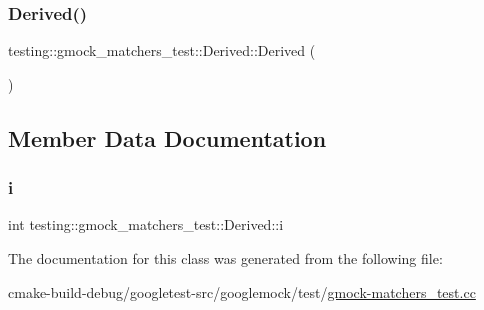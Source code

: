 \subsubsection{\texorpdfstring{Derived()}{Derived()}}
{\footnotesize\ttfamily testing\+::gmock\+\_\+matchers\+\_\+test\+::\+Derived\+::\+Derived (\begin{DoxyParamCaption}{ }\end{DoxyParamCaption})\hspace{0.3cm}{\ttfamily [inline]}}



\subsection{Member Data Documentation}
\mbox{\label{classtesting_1_1gmock__matchers__test_1_1Derived_a357d6747c44d7af7159fb5898a782f1b}} 
\subsubsection{\texorpdfstring{i}{i}}
{\footnotesize\ttfamily int testing\+::gmock\+\_\+matchers\+\_\+test\+::\+Derived\+::i}



The documentation for this class was generated from the following file\+:\begin{DoxyCompactItemize}
\item 
cmake-\/build-\/debug/googletest-\/src/googlemock/test/\mbox{\hyperlink{gmock-matchers__test_8cc}{gmock-\/matchers\+\_\+test.\+cc}}\end{DoxyCompactItemize}
